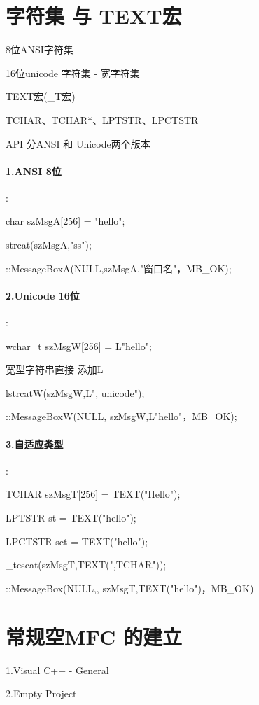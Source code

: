 \documentclass[UTF8,a4paper,8pt]{ctexart}
\begin{document}
 
 \section{字符集 与 TEXT宏}
  
	  8位ANSI字符集
	  
	  16位unicode 字符集 - 宽字符集
	  
	  TEXT宏(\_T宏)
	  
	  TCHAR、TCHAR*、LPTSTR、LPCTSTR
	  
	  API 分ANSI 和 Unicode两个版本
  
	  \paragraph{1.ANSI 8位}:
	  
		  char szMsgA[256]  = "hello";
		  
		  strcat(szMsgA,"ss");
		  
		  ::MessageBoxA(NULL,szMsgA,"窗口名"，MB\_OK);
	  
	  \paragraph{2.Unicode 16位}:
	   
		   wchar\_t szMsgW[256] = L"hello";
		   
		   宽型字符串直接 添加L
		   
		   lstrcatW(szMsgW,L", unicode");
		   
		   ::MessageBoxW(NULL, szMsgW,L"hello"，MB\_OK);
	   
	   \paragraph{3.自适应类型}:
		   
		   TCHAR szMsgT[256] = TEXT("Hello");
		   
		   LPTSTR st = TEXT("hello");
		   
		   LPCTSTR sct = TEXT("hello");
		   
		   \_tcscat(szMsgT,TEXT(",TCHAR"));
		   
		   ::MessageBox(NULL,, szMsgT,TEXT("hello")，MB\_OK)
   
   
   \section{常规空MFC 的建立}
	   1.Visual C++ - General
	   
	   2.Empty Project
	   
\end{document}
